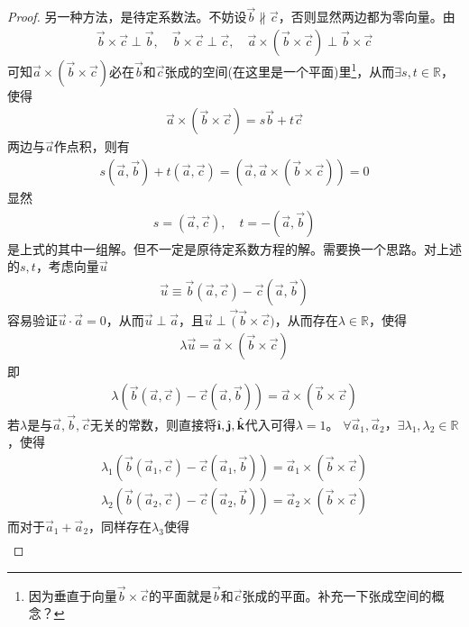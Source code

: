 \begin{proof}
  另一种方法，是待定系数法。不妨设$\vec b\not\parallel\vec c$，否则显然两边都为零向量。由
  \begin{align*}
    \vec b\times\vec c\perp \vec b,\quad \vec b\times\vec c\perp \vec c,\quad
    \vec a\times(\vec b\times\vec c)\perp \vec b\times \vec c
  \end{align*}
  可知$\vec a\times(\vec b\times\vec c)$必在$\vec b$和$\vec c$张成的空间(在这里是一个平面)里\footnote{因为垂直于向量$\vec b\times\vec c$的平面就是$\vec b$和$\vec c$张成的平面。\color{red}补充一下张成空间的概念？}，从而$\exists s,t\in\mathbb{R}$，使得
  \begin{align*}
    \vec a\times(\vec b\times\vec c) = s\vec b +t\vec c
  \end{align*}
  两边与$\vec a$作点积，则有
  \begin{align*}
    s(\vec a,\vec b)+t(\vec a,\vec c)=(\vec a, \vec a\times(\vec b\times\vec c))=0
  \end{align*}
  显然
  \begin{align*}
    s=(\vec a,\vec c),\quad
    t=-(\vec a,\vec b)
  \end{align*}
  是上式的其中一组解。{\color{red}但不一定是原待定系数方程的解。需要换一个思路。}对上述的$s,t$，考虑向量$\vec u$
  \begin{align*}
    \vec u\equiv \vec b(\vec a,\vec c) - \vec c(\vec a, \vec b)
  \end{align*}
  容易验证$\vec u\cdot \vec a=0$，从而$\vec u\perp\vec a$，且$\vec u\perp\vec (\vec b\times\vec c)$，从而存在$\lambda\in\mathbb{R}$，使得
  \begin{align*}
    \lambda \vec u = \vec a\times(\vec b\times\vec c)
  \end{align*}
  即
  \begin{align*}
    \lambda(\vec b(\vec a,\vec c) - \vec c(\vec a, \vec b)) = \vec a\times(\vec b\times\vec c)
  \end{align*}
  {\color{red}若$\lambda$是与$\vec a,\vec b,\vec c$无关的常数，则直接将$\ihat, \jhat, \khat$代入可得$\lambda=1$。}
  $\forall \vec{a}_1, \vec{a}_2$，$\exists \lambda_1,\lambda_2\in\mathbb{R}$，使得
  \begin{align*}
    \lambda_1(\vec b(\vec a_1,\vec c) - \vec c(\vec a_1, \vec b)) = \vec a_1\times(\vec b\times\vec c)\\
    \lambda_2(\vec b(\vec a_2,\vec c) - \vec c(\vec a_2, \vec b)) = \vec a_2\times(\vec b\times\vec c)
  \end{align*}
  而对于$\vec a_1 + \vec a_2$，同样存在$\lambda_3$使得
  \begin{align*}

\end{align*}
\end{proof}
